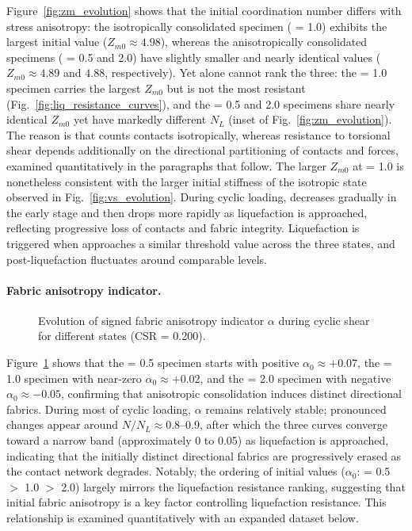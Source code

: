 Figure~\ref{fig:zm_evolution} shows that the initial coordination number differs with stress anisotropy: the isotropically consolidated specimen (\Kzero{} = 1.0) exhibits the largest initial value ($Z_{m0} \approx 4.98$), whereas the anisotropically consolidated specimens (\Kzero{} = 0.5 and 2.0) have slightly smaller and nearly identical values ($Z_{m0} \approx 4.89$ and $4.88$, respectively). Yet \Zm{} alone cannot rank the three: the \Kzero{} = 1.0 specimen carries the largest $Z_{m0}$ but is not the most resistant (Fig.~\ref{fig:liq_resistance_curves}), and the \Kzero{} = 0.5 and 2.0 specimens share nearly identical $Z_{m0}$ yet have markedly different $N_L$ (inset of Fig.~\ref{fig:zm_evolution}). The reason is that \Zm{} counts contacts isotropically, whereas resistance to torsional shear depends additionally on the directional partitioning of contacts and forces, examined quantitatively in the paragraphs that follow. The larger $Z_{m0}$ at \Kzero{} = 1.0 is nonetheless consistent with the larger initial stiffness of the isotropic state observed in Fig.~\ref{fig:vs_evolution}. During cyclic loading, \Zm{} decreases gradually in the early stage and then drops more rapidly as liquefaction is approached, reflecting progressive loss of contacts and fabric integrity. Liquefaction is triggered when \Zm{} approaches a similar threshold value across the three states, and post-liquefaction \Zm{} fluctuates around comparable levels.

\paragraph{Fabric anisotropy indicator.}

\begin{figure}
  \centering
  \caption{Evolution of signed fabric anisotropy indicator $\alpha$ during cyclic shear for different \Kzero{} states (CSR = 0.200).}
  \label{fig:alpha_evolution}
\end{figure}

Figure~\ref{fig:alpha_evolution} shows that the \Kzero{} = 0.5 specimen starts with positive $\alpha_0 \approx +0.07$, the \Kzero{} = 1.0 specimen with near-zero $\alpha_0 \approx +0.02$, and the \Kzero{} = 2.0 specimen with negative $\alpha_0 \approx -0.05$, confirming that anisotropic consolidation induces distinct directional fabrics. During most of cyclic loading, $\alpha$ remains relatively stable; pronounced changes appear around $N/N_L \approx 0.8$--$0.9$, after which the three curves converge toward a narrow band (approximately 0 to 0.05) as liquefaction is approached, indicating that the initially distinct directional fabrics are progressively erased as the contact network degrades. Notably, the ordering of initial values ($\alpha_0$: \Kzero{} = 0.5 $>$ 1.0 $>$ 2.0) largely mirrors the liquefaction resistance ranking, suggesting that initial fabric anisotropy is a key factor controlling liquefaction resistance. This relationship is examined quantitatively with an expanded dataset below.

